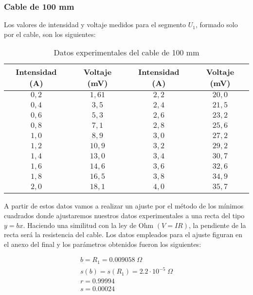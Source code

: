 \documentclass[a4paper,12pt,titlepage]{article}
\begin{document}
\subsubsection{Cable de 100 mm}

Los valores de intensidad y voltaje medidos para el segmento $U_{1}$, formado solo por el cable, son los siguientes:

\begin{table}
\centering
    \begin{tabular}{|c|c|c|c|}
        \hline
        Intensidad (A) & Voltaje (mV) & Intensidad (A) & Voltaje (mV) \\ \hline
        $0,2$ & $1,61$ & $2,2$ & $20,0$ \\ \hline
        $0,4$ & $3,5$ & $2,4$ & $21,5$ \\ \hline
        $0,6$ & $5,3$ & $2,6$ & $23,2$ \\ \hline
        $0,8$ & $7,1$ & $2,8$ & $25,6$ \\ \hline
        $1,0$ & $8,9$ & $3,0$ & $27,2$ \\ \hline
        $1,2$ & $10,9$ & $3,2$ & $29,2$ \\ \hline
        $1,4$ & $13,0$ & $3,4$ & $30,7$ \\ \hline
        $1,6$ & $14,6$ & $3,6$ & $32,6$ \\ \hline
        $1,8$ & $16,5$ & $3,8$ & $34,9$ \\ \hline
        $2,0$ & $18,1$ & $4,0$ & $35,7$ \\ \hline
    \end{tabular}
    \caption{Datos experimentales del cable de 100 mm}
\end{table}

A partir de estos datos vamos a realizar un ajuste por el método de los mínimos cuadrados donde ajustaremos nuestros datos experimentales a una recta del tipo $y=bx$. Haciendo una similitud con la ley de Ohm $(V=IR)$, la pendiente de la recta será la resistencia del cable. Los datos empleados para el ajuste figuran en el anexo del final y los parámetros obtenidos fueron los siguientes:

\begin{equation}
    \begin{gathered}
        b =R_{1}= 0.009058 \; \Omega 
        \\
        s(b) = s(R_{1})= 2.2 \cdot 10^{-5} \; \Omega
        \\
        r = 0.99994
        \\
        s = 0.00024
    \end{gathered}
\end{equation}
\end{document}
